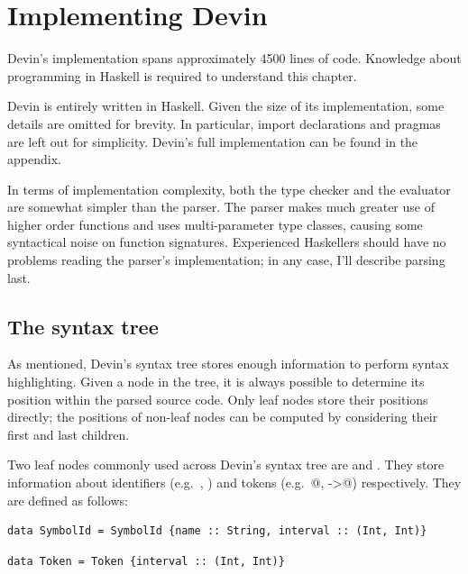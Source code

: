 \documentclass[UdineBachThesis,american,11pt,draft]{PhdThesis}
\begin{document}
  \chapter{Implementing Devin}

  Devin's implementation spans approximately 4500 lines of code. Knowledge about
  programming in Haskell is required to understand this chapter.

  Devin is entirely written in Haskell. Given the size of its implementation,
  some details are omitted for brevity. In particular, import declarations and
  \lstinline@LANGUAGE@ pragmas are left out for simplicity. Devin's full
  implementation can be found in the appendix.

  In terms of implementation complexity, both the type checker and the evaluator
  are somewhat simpler than the parser. The parser makes much greater use of
  higher order functions and uses multi-parameter type classes, causing some
  syntactical noise on function signatures. Experienced Haskellers should have
  no problems reading the parser's implementation; in any case, I'll describe
  parsing last.

  \section{The syntax tree}

  As mentioned, Devin's syntax tree stores enough information to perform syntax
  highlighting. Given a node in the tree, it is always possible to determine its
  position within the parsed source code. Only leaf nodes store their positions
  directly; the positions of non-leaf nodes can be computed by considering their
  first and last children.

  Two leaf nodes commonly used across Devin's syntax tree are
  \lstinline@SymbolId@ and \lstinline@Token@. They store information about
  identifiers (e.g.\ \lstinline@x@, \lstinline@Int@) and tokens (e.g.\
  @, \lstinline@->@) respectively. They are defined
  as follows:

  \begin{lstlisting}[gobble=4,basicstyle=\ttfamily\small]
    data SymbolId = SymbolId {name :: String, interval :: (Int, Int)}
  \end{lstlisting}

  \begin{lstlisting}[gobble=4,basicstyle=\ttfamily\small]
    data Token = Token {interval :: (Int, Int)}
  \end{lstlisting}
\end{document}
